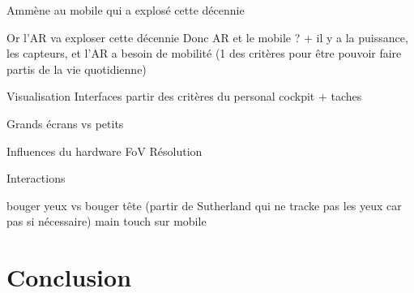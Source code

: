 Ammène au mobile qui a explosé cette décennie

Or l'AR va exploser cette décennie
Donc AR et le mobile ? + il y a la puissance, les capteurs, et l'AR a besoin de mobilité (1 des critères pour être pouvoir faire partis de la vie quotidienne) \cite[]{VanKrevelenPoelman2010}


Visualisation
Interfaces
partir des critères du personal cockpit
+ taches

Grands écrans vs petits

Influences du hardware
FoV
Résolution


Interactions

bouger yeux vs bouger tête (partir de Sutherland qui ne tracke pas les yeux car pas si nécessaire)
main
touch sur mobile


\section*{Conclusion}
